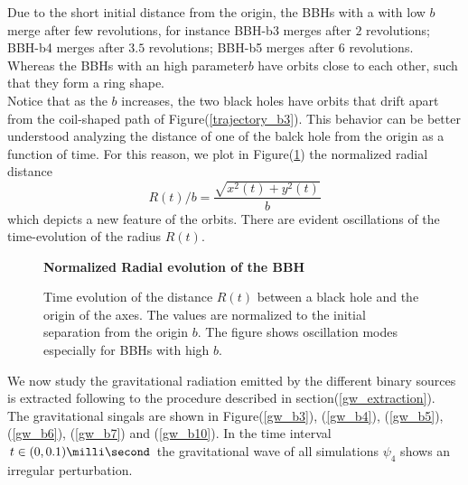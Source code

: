 Due to the short initial distance from the origin, the BBHs with a  with low $b$ merge after few revolutions, for instance BBH-b3 merges after $2$ revolutions; BBH-b4 merges after
$3.5$ revolutions; BBH-b5 merges after $6$ revolutions.
Whereas the BBHs with an high parameter$b$ have orbits close to each other, such that they form a ring shape.\\
Notice that as the $b$ increases, the two black holes have orbits that drift apart from the coil-shaped path of Figure(\ref{trajectory_b3}).
This behavior can be better understood analyzing the distance of one of the balck hole from the origin as a function of time. 
For this reason, we plot in Figure(\ref{radius_evolution}) the normalized radial distance
\[
R(t)/b = \frac{\sqrt{x ^{2} (t) + y^{2} (t)}}{b}
\]
which depicts a new feature of the orbits. There are evident oscillations of the time-evolution of the radius $R(t)$.
\begin{figure}
\centering
    \textbf{Normalized Radial evolution of the BBH}\par\medskip
{}
\caption{Time evolution of the distance $R(t)$ between a black hole and the origin of the axes. The values are normalized to the initial separation from the origin $b$. The figure shows oscillation modes especially for BBHs with high $b$.}
\label{radius_evolution}
\end{figure}
\par
We now study the gravitational radiation emitted by the different binary sources is extracted following to the procedure described in section(\ref{gw_extraction}).\\
The gravitational singals are shown in Figure(\ref{gw_b3}), (\ref{gw_b4}), (\ref{gw_b5}), (\ref{gw_b6}), (\ref{gw_b7}) and (\ref{gw_b10}).
In the time interval $t \in (0,0.1)\milli \second$ the gravitational wave of all simulations $\psi_4$ shows an irregular perturbation. 
